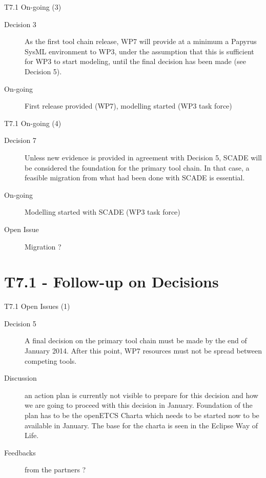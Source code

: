 \begin{frame}{T7.1 On-going (3)}

\begin{description}
\item[Decision 3] As the first tool chain release, WP7 will provide at a minimum a Papyrus SysML environment to WP3, under the assumption that this is sufficient for WP3 to start modeling, until the final decision has been made (see Decision 5).
\item[On-going] First release provided (WP7), modelling started (WP3 task force)
\end{description}
\end{frame}


\begin{frame}{T7.1 On-going (4)}

\begin{description}
\item[Decision 7] Unless new evidence is provided in agreement with Decision 5, SCADE will be considered the foundation for the primary tool chain. In that case, a feasible migration from what had been done with SCADE is essential.
\item[On-going] Modelling started with SCADE (WP3 task force)
\item[Open Issue] Migration ?
\end{description}
\end{frame}


%
\section{T7.1 - Follow-up on Decisions}


\begin{frame}{T7.1 Open Issues (1)}

\begin{description}
\item[Decision 5] A final decision on the primary tool chain must be made by the end of January 2014. After this point, WP7 resources must not be spread between competing tools.
\item[Discussion]  an action plan is currently not visible to prepare for this decision and how we are going to proceed with this decision in January. Foundation of the plan has to be the openETCS Charta which needs to be started now to be available in January. The base for the charta is seen in the Eclipse Way of Life.
\item[Feedbacks] from the partners ?
\end{description}

\end{frame}

